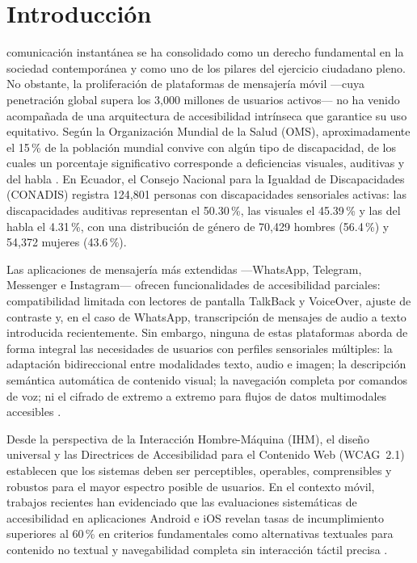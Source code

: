 \documentclass[journal]{IEEEtran}
\begin{document}
\section{Introducci\'on}
 comunicaci\'on instant\'anea se ha consolidado como un derecho fundamental en la sociedad contempor\'anea y como uno de los pilares del ejercicio ciudadano pleno. No obstante, la proliferaci\'on de plataformas de mensajer\'ia m\'ovil ---cuya penetraci\'on global supera los 3{,}000 millones de usuarios activos--- no ha venido acompa\~nada de una arquitectura de accesibilidad intr\'inseca que garantice su uso equitativo. Seg\'un la Organizaci\'on Mundial de la Salud (OMS), aproximadamente el 15\,\% de la poblaci\'on mundial convive con alg\'un tipo de discapacidad, de los cuales un porcentaje significativo corresponde a deficiencias visuales, auditivas y del habla \cite{who2011}. En Ecuador, el Consejo Nacional para la Igualdad de Discapacidades (CONADIS) registra 124{,}801 personas con discapacidades sensoriales activas: las discapacidades auditivas representan el 50.30\,\%, las visuales el 45.39\,\% y las del habla el 4.31\,\%, con una distribuci\'on de g\'enero de 70{,}429 hombres (56.4\,\%) y 54{,}372 mujeres (43.6\,\%).

Las aplicaciones de mensajer\'ia m\'as extendidas ---WhatsApp, Telegram, Messenger e Instagram--- ofrecen funcionalidades de accesibilidad parciales: compatibilidad limitada con lectores de pantalla TalkBack y VoiceOver, ajuste de contraste y, en el caso de WhatsApp, transcripci\'on de mensajes de audio a texto introducida recientemente. Sin embargo, ninguna de estas plataformas aborda de forma integral las necesidades de usuarios con perfiles sensoriales m\'ultiples: la adaptaci\'on bidireccional entre modalidades texto, audio e imagen; la descripci\'on sem\'antica autom\'atica de contenido visual; la navegaci\'on completa por comandos de voz; ni el cifrado de extremo a extremo para flujos de datos multimodales accesibles \cite{bercaru2024, weichbroth2020}.

Desde la perspectiva de la Interacci\'on Hombre-M\'aquina (IHM), el dise\~no universal \cite{story1998} y las Directrices de Accesibilidad para el Contenido Web (WCAG~2.1) \cite{w3c2018} establecen que los sistemas deben ser perceptibles, operables, comprensibles y robustos para el mayor espectro posible de usuarios. En el contexto m\'ovil, trabajos recientes han evidenciado que las evaluaciones sistem\'aticas de accesibilidad en aplicaciones Android e iOS revelan tasas de incumplimiento superiores al 60\,\% en criterios fundamentales como alternativas textuales para contenido no textual y navegabilidad completa sin interacci\'on t\'actil precisa \cite{chen2022, acosta2020}.
\end{document}
